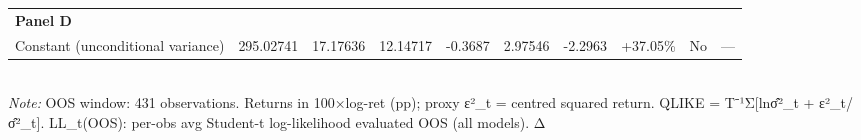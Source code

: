 \begin{table}[ht]
\begin{tabular}{lrrrrrrrrr}
\multicolumn{10}{l}{\textbf{Panel D}} \\
Constant (unconditional variance) & 295.02741 & 17.17636 & 12.14717 & -0.3687 & 2.97546 & -2.2963 & +37.05\% & No & — \\
\bottomrule
\end{tabular}
\\[3pt]\footnotesize\textit{Note:} OOS window: 431 observations. Returns in 100×log-ret (pp); proxy ε²_t = centred squared return. QLIKE = T⁻¹Σ[lnσ̂²_t + ε²_t/σ̂²_t]. LL_t(OOS): per-obs avg Student-t log-likelihood evaluated OOS (all models). Δ%
\end{table}